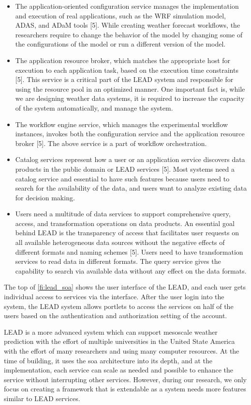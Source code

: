 \begin{itemize}
    \item The application-oriented configuration service manages the implementation and execution of real applications, such as the WRF simulation model, ADAS, and ADaM tools [5]. While creating weather forecast workflows, the researchers require to change the behavior of the model by changing some of the configurations of the model or run a different version of the model.
    \item The application resource broker, which matches the appropriate host for execution to each application task, based on the execution time constraints [5]. This service is a critical part of the LEAD system and responsible for using the resource pool in an optimized manner. One important fact is, while we are designing weather data systems, it is required to increase the capacity of the system automatically, and manage the system.
    \item The workflow engine service, which manages the experimental workflow instances, invokes both the configuration service and the application resource broker [5]. The above service is a part of workflow orchestration.
    \item Catalog services represent how a user or an application service discovers data products in the public domain or LEAD services [5]. Most systems need a catalog service and essential to have such features because users need to search for the availability of the data, and users want to analyze existing data for decision making.
    \item Users need a multitude of data services to support comprehensive query, access, and transformation operations on data products. An essential goal behind LEAD is the transparency of access that facilitates user requests on all available heterogeneous data sources without the negative effects of different formats and naming schemes [5]. Users need to have transformation services to read data in different formats. The query service gives the capability to search via available data without any effect on the data formats.
\end{itemize}

The top of \cref{fi:lead_soa} shows the user interface of the LEAD, and each user gets individual access to services via the interface. After the user login into the system, the LEAD system allows portlets to access the services on half of the users based on the authentication and authorization setting of the account.

LEAD is a more advanced system which can support mesoscale weather prediction with the effort of multiple universities in the United State America with the effort of many researchers and using many computer resources. At the time of  building, it uses the \acrshort{soa} architecture into its depth, and at the implementation, each service can scale as needed and possible to enhance the service without interrupting other services. However, during our research, we only focus on creating a framework that is extendable as a system needs more features similar to LEAD services.
